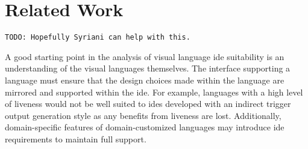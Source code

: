 \section{Related Work} \label{sec:relatedwork}

\begin{verbatim}
TODO: Hopefully Syriani can help with this.
\end{verbatim}

A good starting point in the analysis of visual language \ac{ide}
suitability is an understanding of the visual languages themselves. The
interface supporting a language must ensure that the design choices made
within the language are mirrored and supported within the \ac{ide}.
\cite{hils1992} For example, languages with a high level of liveness
\cite{hils1992} would not be well suited to \acp{ide} developed with an
indirect trigger output generation style as any benefits from liveness are
lost. Additionally, domain-specific features of domain-customized languages
may introduce \ac{ide} requirements to maintain full support.
